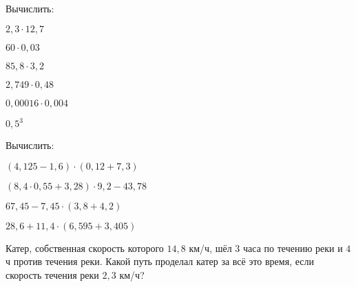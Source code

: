 \begin{class}[number=3]
\begin{listofex}
\begin{enumcols}[itemcolumns=2]
		\end{enumcols}
		\item Вычислить:
		\begin{enumcols}[itemcolumns=3]
			\item \( 2,3\cdot12,7 \)
			\item \( 60\cdot0,03 \)
			\item \( 85,8\cdot3,2 \)
			\item \( 2,749\cdot0,48 \)
			\item \( 0,00016\cdot0,004 \)
			\item \( 0,5^3 \)
		\end{enumcols}
		\item Вычислить:
		\begin{enumcols}[itemcolumns=2]
			\item \( (4,125-1,6)\cdot(0,12+7,3) \)
			\item \( (8,4\cdot0,55+3,28)\cdot9,2-43,78 \)
			\item \( 67,45-7,45\cdot(3,8+4,2) \)
			\item \( 28,6+11,4\cdot(6,595+3,405) \)
		\end{enumcols}
		\item Катер, собственная скорость которого \( 14,8 \) км/ч, шёл \( 3 \) часа по течению реки и \( 4 \) ч против течения реки. Какой путь проделал катер за всё это время, если скорость течения реки \( 2,3 \) км/ч?
	\end{listofex}
\end{class}

